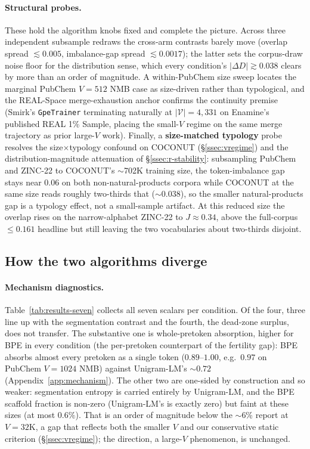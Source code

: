 \documentclass{article}
\begin{document}
\paragraph{Structural probes.}
These hold the algorithm knobs fixed and complete the picture.
Across three independent subsample redraws the cross-arm contrasts barely move
(overlap spread $\lesssim 0.005$, imbalance-gap spread $\lesssim 0.0017$); the
latter sets the corpus-draw noise floor for the distribution sense, which every
condition's $|\Delta D| \gtrsim 0.038$ clears by more than an order of
magnitude. A within-PubChem size sweep locates the marginal PubChem $V{=}512$
NMB case as size-driven rather than typological, and the REAL-Space
merge-exhaustion anchor confirms the continuity premise (Smirk's
\texttt{GpeTrainer} terminating naturally at $|\mathcal{V}| = 4{,}331$ on
Enamine's published REAL 1\% Sample, placing the small-$V$ regime on the same
merge trajectory as prior large-$V$ work). Finally, a \textbf{size-matched
typology} probe resolves the size$\times$typology confound on COCONUT
(\S\ref{ssec:vregime}) and the distribution-magnitude attenuation of
\S\ref{ssec:r-stability}: subsampling PubChem and ZINC-22 to COCONUT's
$\sim$702K training size, the token-imbalance gap stays near $0.06$ on both
non-natural-products corpora while COCONUT at the same size reads roughly
two-thirds that ($\sim$$0.038$), so the smaller natural-products gap is a typology effect,
not a small-sample artifact. At this reduced size the overlap rises on the
narrow-alphabet ZINC-22 to $J \approx 0.34$, above the full-corpus $\le 0.161$ headline but still leaving
the two vocabularies about two-thirds disjoint.

\subsection{How the two algorithms diverge}\label{ssec:r-mechanism}

\paragraph{Mechanism diagnostics.}
Table~\ref{tab:results-seven} collects all seven scalars per condition. Of the
four, three line up with the segmentation contrast and the
fourth, the dead-zone surplus, does not transfer. The substantive one is whole-pretoken absorption,
higher for BPE in every condition (the per-pretoken counterpart of the fertility
gap): BPE absorbs almost every pretoken as a single token ($0.89$--$1.00$, e.g.\
$0.97$ on PubChem $V{=}1024$ NMB) against Unigram-LM's $\sim$$0.72$
(Appendix~\ref{app:mechanism}). The other two are one-sided by construction and
so weaker: segmentation entropy is carried entirely by Unigram-LM, and the BPE
scaffold fraction is non-zero (Unigram-LM's is exactly zero) but faint at
these sizes (at most $0.6\%$). That is an order of magnitude below the $\sim$6\%
\citet{lian2024scaffold-bpe} report at $V{=}32$K, a gap that reflects both the
smaller $V$ and our conservative static criterion (\S\ref{ssec:vregime}); the
direction, a large-$V$ phenomenon, is unchanged.
\end{document}
